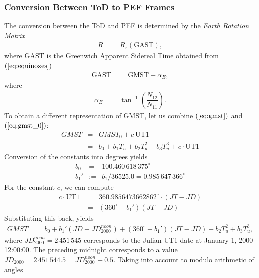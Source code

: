 \documentclass [12pt, a4paper] {article}
\begin{document}
\subsubsection{Conversion Between ToD to PEF Frames}
The conversion between the ToD and PEF is determined by the \emph{Earth Rotation Matrix}
\begin {eqnarray}
  R &=& R_z(\textrm{GAST}),
\end {eqnarray}
where $\textrm{GAST}$ is the Greenwich Apparent Sidereal Time obtained from 
$(\ref{eq:equinoxes})$
\begin {eqnarray}
  \textrm{GAST} &=& \textrm{GMST} - \alpha_E,
\end {eqnarray}
where
\begin {eqnarray}
  \alpha_E &=& \tan^{-1}\left(
    \dfrac{N_{12}}{N_{11}}
  \right).
\end {eqnarray}
To obtain a different representation of GMST, let us combine $(\ref{eq:gmst})$ and 
$(\ref{eq:gmst_0})$:
\begin {eqnarray}
  GMST 
  &=& 
  GMST_0 + c\:\textrm{UT1} \\
  \nonumber
  &=&
  b_0 + b_1T_u + b_2T_u^2 + b_3T_u^3 + c\cdot\textrm{UT1}
\end {eqnarray}
Conversion of the constants into degrees yields
\begin {eqnarray}
  \nonumber
  b_0 &=& 100.460\,618\,375^\circ\\
  \nonumber
  b_1' &:=& b_1 / 36525.0 = 0.985\,647\,366^\circ %
\end {eqnarray}
For the constant $c$, we can compute
\begin {eqnarray}
  c\cdot\textrm{UT1
  } &=& 360.9856473662862^\circ\cdot(JT - JD) \\
  \nonumber 
  &=&
  (360^\circ + b_1')(JT - JD) 
\end {eqnarray}
Substituting this back, yields 
\begin {eqnarray}
  \nonumber
  GMST &=& b_0 + b_1'(JD - JD_{2000}^{noon}) + (360^\circ + b_1')(JT - JD) 
  + b_2T_u^2 + b_3T_u^3,
\end {eqnarray}
where $JD_{2000}^{noon}=2\,451\,545$ corresponds to the Julian UT1 date at January 1, 2000 12:00:00.
The preceding midnight corresponds to a value $JD_{2000} = 2\,451\,544.5 = JD_{2000}^{noon} -0.5$.
Taking into account to modulo arithmetic of angles
\end{document}
